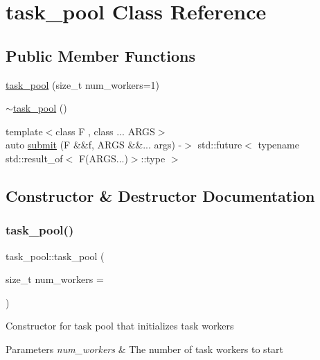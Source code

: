 \hypertarget{classtask__pool}{}\section{task\+\_\+pool Class Reference}
\label{classtask__pool}
\subsection*{Public Member Functions}
\begin{DoxyCompactItemize}
\item 
\hyperlink{classtask__pool_aa0a3c9689f5cb58670a5b4f523452a59}{task\+\_\+pool} (size\+\_\+t num\+\_\+workers=1)
\item 
\hyperlink{classtask__pool_ae68e373cffd48b66f872120f7b65e74a}{$\sim$task\+\_\+pool} ()
\item 
{\footnotesize template$<$class F , class ... A\+R\+GS$>$ }\\auto \hyperlink{classtask__pool_a1278806d5bf37f76983db19ec64712b5}{submit} (F \&\&f, A\+R\+GS \&\&... args) -\/$>$ std\+::future$<$ typename std\+::result\+\_\+of$<$ F(A\+R\+G\+S...)$>$\+::type $>$
\end{DoxyCompactItemize}


\subsection{Constructor \& Destructor Documentation}
\mbox{\label{classtask__pool_aa0a3c9689f5cb58670a5b4f523452a59}} 
\subsubsection{\texorpdfstring{task\+\_\+pool()}{task\_pool()}}
{\footnotesize\ttfamily task\+\_\+pool\+::task\+\_\+pool (\begin{DoxyParamCaption}\item[{size\+\_\+t}]{num\+\_\+workers = {} }\end{DoxyParamCaption})\hspace{0.3cm}{\ttfamily [inline]}}

Constructor for task pool that initializes task workers 
\begin{DoxyParams}{Parameters}
{\em num\+\_\+workers} & The number of task workers to start \\
\hline
\end{DoxyParams}
\mbox{\label{classtask__pool_ae68e373cffd48b66f872120f7b65e74a}} 
